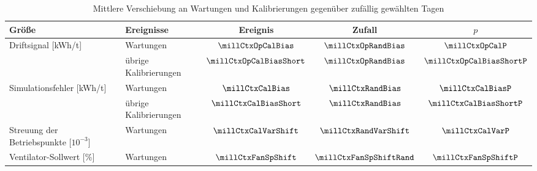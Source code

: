 %
\begin{table}[tbp]
\centering
\caption{Mittlere Verschiebung an Wartungen und Kalibrierungen gegenüber zufällig gewählten Tagen}
\label{tab:mill_event_tests}
\begin{tabular}{llccc}
\toprule
\textbf{Größe} & \textbf{Ereignisse} & Ereignis & Zufall & $p$ \\
\midrule
Driftsignal [kWh/t]                    & Wartungen             & $\millCtxOpCalBias$      & $\millCtxOpRandBias$   & $\millCtxOpCalP$ \\
                                       & übrige Kalibrierungen & $\millCtxOpCalBiasShort$ & $\millCtxOpRandBias$   & $\millCtxOpCalBiasShortP$ \\
\midrule
Simulationsfehler [kWh/t]              & Wartungen             & $\millCtxCalBias$        & $\millCtxRandBias$     & $\millCtxCalBiasP$ \\
                                       & übrige Kalibrierungen & $\millCtxCalBiasShort$   & $\millCtxRandBias$     & $\millCtxCalBiasShortP$ \\
\midrule
Streuung der Betriebspunkte [$10^{-3}$] & Wartungen            & $\millCtxCalVarShift$    & $\millCtxRandVarShift$ & $\millCtxCalVarP$ \\
Ventilator-Sollwert [\%]               & Wartungen             & $\millCtxFanSpShift$     & $\millCtxFanSpShiftRand$ & $\millCtxFanSpShiftP$ \\
\bottomrule
\end{tabular}
\end{table}
%
%
